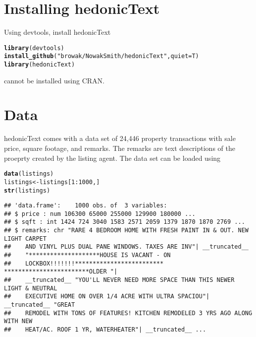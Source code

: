 \documentclass{article}\usepackage[]{graphicx}\usepackage[]{color}
\makeatletter
\newcommand{\hlnum}[1]{\textcolor[rgb]{0.686,0.059,0.569}{#1}}%
\newcommand{\hlstr}[1]{\textcolor[rgb]{0.192,0.494,0.8}{#1}}%
\newcommand{\hlopt}[1]{\textcolor[rgb]{0,0,0}{#1}}%
\newcommand{\hlstd}[1]{\textcolor[rgb]{0.345,0.345,0.345}{#1}}%
\newcommand{\hlkwb}[1]{\textcolor[rgb]{0.69,0.353,0.396}{#1}}%
\newcommand{\hlkwc}[1]{\textcolor[rgb]{0.333,0.667,0.333}{#1}}%
\newcommand{\hlkwd}[1]{\textcolor[rgb]{0.737,0.353,0.396}{\textbf{#1}}}%
\newenvironment{kframe}{%
 \def\at@end@of@kframe{}%
 \ifinner\ifhmode%
  \def\at@end@of@kframe{\end{minipage}}%
  \begin{minipage}{\columnwidth}%
 \fi\fi%
 \def\FrameCommand##1{\hskip\@totalleftmargin \hskip-\fboxsep
 \colorbox{shadecolor}{##1}\hskip-\fboxsep
     \hskip-\linewidth \hskip-\@totalleftmargin \hskip\columnwidth}%
 \MakeFramed {\advance\hsize-\width
   \@totalleftmargin\z@ \linewidth\hsize
   \@setminipage}}%
 {\par\unskip\endMakeFramed%
 \at@end@of@kframe}
\newenvironment{knitrout}{}{} %
\newcommand{\pkg}[1]{{\fontseries{b}\selectfont #1}}
\makeatother
\begin{document}
\section{Installing \pkg{hedonicText}}
Using \pkg{devtools}, install \pkg{hedonicText}
\begin{knitrout}\footnotesize
{}\color{fgcolor}\begin{kframe}
\begin{alltt}
\hlkwd{library}\hlstd{(devtools)}
\hlkwd{install_github}\hlstd{(}\hlstr{"browak/NowakSmith/hedonicText"} \hlstd{,} \hlkwc{quiet}\hlstd{=T)}
\hlkwd{library}\hlstd{(hedonicText)}
\end{alltt}
\end{kframe}
\end{knitrout}
\noindent \pkg{hedonicText} cannot be installed using CRAN.

\section{Data}
\pkg{hedonicText} comes with a data set of 24,446 property transactions with sale price, square footage, and remarks.  The remarks are text descriptions of the proeprty created by the listing agent.  The data set can be loaded using
\begin{knitrout}\footnotesize
{}\color{fgcolor}\begin{kframe}
\begin{alltt}
\hlkwd{data}\hlstd{(listings)}
\hlstd{listings} \hlkwb{<-} \hlstd{listings[}\hlnum{1}\hlopt{:}\hlnum{1000}\hlstd{, ]}
\hlkwd{str}\hlstd{(listings)}
\end{alltt}
\begin{verbatim}
## 'data.frame':	1000 obs. of  3 variables:
## $ price : num 106300 65000 255000 129900 180000 ...
## $ sqft : int 1424 724 3040 1583 2571 2059 1379 1870 1870 2769 ...
## $ remarks: chr "RARE 4 BEDROOM HOME WITH FRESH PAINT IN & OUT. NEW LIGHT CARPET
##    AND VINYL PLUS DUAL PANE WINDOWS. TAXES ARE INV"| __truncated__
##    "********************HOUSE IS VACANT - ON
##    LOCKBOX!!!!!!!************************* ************************OLDER "|
##    __truncated__ "YOU'LL NEVER NEED MORE SPACE THAN THIS NEWER LIGHT & NEUTRAL
##    EXECUTIVE HOME ON OVER 1/4 ACRE WITH ULTRA SPACIOU"| __truncated__ "GREAT
##    REMODEL WITH TONS OF FEATURES! KITCHEN REMODELED 3 YRS AGO ALONG WITH NEW
##    HEAT/AC. ROOF 1 YR, WATERHEATER"| __truncated__ ...
\end{verbatim}
\end{kframe}
\end{knitrout}
\end{document}
